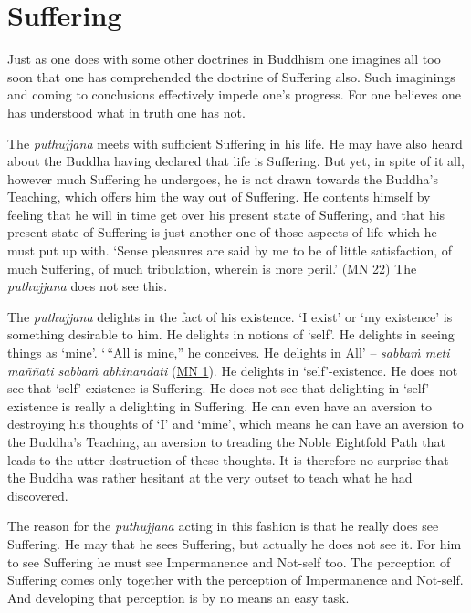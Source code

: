 \chapter{Suffering}

Just as one does with some other doctrines in Buddhism one imagines all too soon that one has comprehended the doctrine of Suffering also. Such imaginings and coming to conclusions effectively impede one's progress. For one believes one has understood what in truth one has not.

The \emph{puthujjana} meets with sufficient Suffering in his life. He may have also heard about the Buddha having declared that life is Suffering. But yet, in spite of it all, however much Suffering he undergoes, he is not drawn towards the Buddha's Teaching, which offers him the way out of Suffering. He contents himself by feeling that he will in time get over his present state of Suffering, and that his present state of Suffering is just another one of those aspects of life which he must put up with. `Sense pleasures are said by me to be of little satisfaction, of much Suffering, of much tribulation, wherein is more peril.' (\href{https://suttacentral.net/mn22/en/bodhi}{MN 22}) The \emph{puthujjana} does not see this.

\enlargethispage{\baselineskip}

The \emph{puthujjana} delights in the fact of his existence. `I exist' or `my existence' is something desirable to him. He delights in notions of `self'. He delights in seeing things as `mine'. `\,``All is mine,'' he conceives. He delights in All' -- \emph{sabbaṁ meti maññati sabbaṁ abhinandati} (\href{https://suttacentral.net/mn1/en/bodhi}{MN 1}). He delights in `self'-existence. He does not see that `self'-existence is Suffering. He does not see that delighting in `self'-existence is really a delighting in Suffering. He can even have an aversion to destroying his thoughts of `I' and `mine', which means he can have an aversion to the Buddha's Teaching, an aversion to treading the Noble Eightfold Path that leads to the utter destruction of these thoughts. It is therefore no surprise that the Buddha was rather hesitant at the very outset to teach what he had discovered.

The reason for the \emph{puthujjana} acting in this fashion is that he really does  see Suffering. He may  that he sees Suffering, but actually he does not see it. For him to see Suffering he must see Impermanence and Not-self too. The perception of Suffering comes only together with the perception of Impermanence and Not-self. And developing that perception is by no means an easy task.

